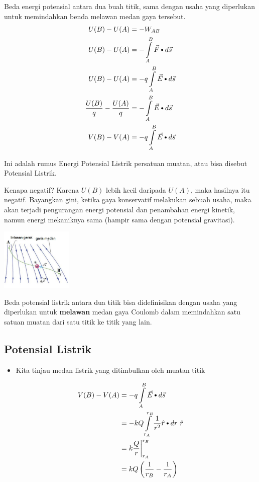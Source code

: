 \documentclass[twocolumn, 11pt]{article}%
\newcommand\sbullet[1][.5]{\mathbin{\ThisStyle{\vcenter{\hbox{%
  \scalebox{#1}{$\SavedStyle\bullet$}}}}}%
}
\begin{document}
    Beda energi potensial antara dua buah titik, sama dengan usaha yang diperlukan untuk memindahkan benda melawan medan gaya tersebut.
    \begin{align*}
        U(B)-U(A)&=-W_{AB}\\
        U(B)-U(A)&=-\int\limits_A^B \vec F\sbullet[.75]d\vec s\\
        U(B)-U(A)&=-q\int\limits_A^B \vec E\sbullet[.75]d\vec s\\
        \frac{U(B)}{q}-\frac{U(A)}{q}&=-\int\limits_A^B \vec E\sbullet[.75]d\vec s\\
        V(B)-V(A)&=-q\int\limits_A^B \vec E\sbullet[.75]d\vec s
    \end{align*}

    Ini adalah rumus Energi Potensial Listrik persatuan muatan, atau bisa disebut Potensial Listrik.

    Kenapa negatif? Karena $U(B)$ lebih kecil daripada $U(A)$, maka hasilnya itu negatif. Bayangkan gini, ketika gaya konservatif melakukan sebuah usaha, maka akan terjadi pengurangan energi potensial dan penambahan energi kinetik, namun energi mekaniknya sama (hampir sama dengan potensial gravitasi).
    \begin{center}
        \includegraphics[width=130px]{1.png}
    \end{center}

    Beda potensial listrik antara dua titik bisa didefinisikan dengan usaha yang diperlukan untuk \textbf{melawan} medan gaya Coulomb dalam memindahkan satu satuan muatan dari satu titik ke titik yang lain.

    \subsection{Potensial Listrik}%
    \begin{itemize}
        \item Kita tinjau medan listrik yang ditimbulkan oleh muatan titik
    \end{itemize}

    \begin{align*}
        V(B)-V(A)&=-q\int\limits_A^B \vec E\sbullet[.75]d\vec s\\
        &=-kQ \int\limits_{r_A}^{r_B}\frac1{r^2}\hat r \sbullet[.75]dr\ \hat r\\
        &=k\frac{Q}r \bigg|_{r_A}^{r_B}\\
        &=kQ\left(\frac1{r_B} - \frac1{r_A}\right)
     \end{align*}
\end{document}
